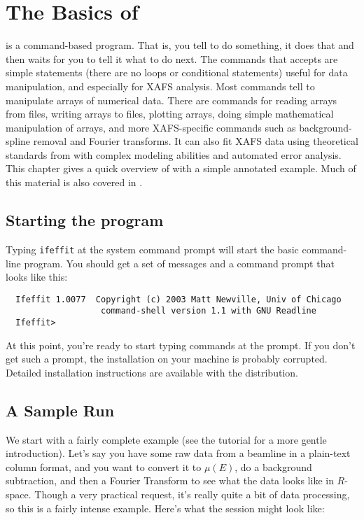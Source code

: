 \section{The Basics of {\ifeffit}} \label{Ch:Basics}

{\ifeffit} is a command-based program. That is, you tell {\ifeffit} to do
something, it does that and then waits for you to tell it what to do next.
The commands that {\ifeffit} accepts are simple statements (there are no
loops or conditional statements) useful for data manipulation, and
especially for XAFS analysis.  Most commands tell {\ifeffit} to manipulate
arrays of numerical data.  There are commands for reading arrays from
files, writing arrays to files, plotting arrays, doing simple mathematical
manipulation of arrays, and more XAFS-specific commands such as
background-spline removal and Fourier transforms.  It can also fit XAFS
data using theoretical standards from {\feff} with complex modeling
abilities and automated error analysis.  This chapter gives a quick
overview of {\ifeffit} with a simple annotated example.  Much of this
material is also covered in {\IFFtut}.

\subsection{Starting the program} \label{Ch:Basics-starting} 

Typing {\tt{ifeffit}} at the system command prompt will start the basic
{\ifeffit} command-line program.  You should get a set of messages and a
command prompt that looks like this:

{\small\begin{verbatim}
  Ifeffit 1.0077  Copyright (c) 2003 Matt Newville, Univ of Chicago
                   command-shell version 1.1 with GNU Readline
  Ifeffit>
\end{verbatim}}
\noindent
At this point, you're ready to start typing {\ifeffit} commands at the
prompt.  If you don't get such a prompt, the installation on your machine
is probably corrupted. Detailed installation instructions are available
with the {\ifeffit} distribution.

\subsection{A Sample Run} \label{Ch:Basics-sample} 

We start with a fairly complete example (see the tutorial for a more gentle
introduction). Let's say you have some raw data from a beamline in a
plain-text column format, and you want to convert it to $\mu(E)$, do a
background subtraction, and then a Fourier Transform to see what the data
looks like in $R$-space.  Though a very practical request, it's really
quite a bit of data processing, so this is a fairly intense example.
Here's what the session might look like:

